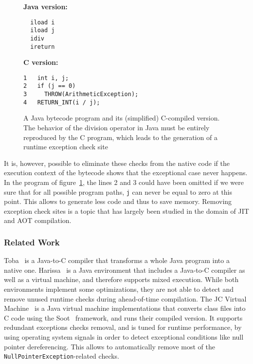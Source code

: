 \begin{figure}[t]
\begin{center}
\begin{minipage}[b]{0.4\linewidth}
\textbf{Java version:}
\centering
\begin{verbatim}
  iload i
  iload j
  idiv
  ireturn
\end{verbatim}
\end{minipage}
\hspace{0.5cm}
\begin{minipage}[b]{0.5\linewidth}
\textbf{C version:}
\centering
\begin{verbatim}
1   int i, j;
2   if (j == 0) 
3     THROW(ArithmeticException);
4   RETURN_INT(i / j);
\end{verbatim}
\end{minipage}
\end{center}
\caption{A Java bytecode program and its (simplified) C-compiled version. The behavior of the division operator in Java must be entirely reproduced by the C program, which leads to the generation of a runtime exception check site}
\label{fig:javatoc}
\end{figure}

It is, however, possible to eliminate these checks from the native code if the execution context of the bytecode shows that the exceptional case never happens. In the program of figure~\ref{fig:javatoc}, the lines 2 and 3 could have been omitted if we were sure that for all possible program paths, \texttt{j} can never be equal to zero at this point. This allows to generate less code and thus to save memory. Removing exception check sites is a topic that has largely been studied in the domain of JIT and AOT compilation.

\subsubsection{Related Work}
\label{sec:relatedwork}
Toba~\cite{Proebsting1997} is a Java-to-C compiler that transforms a whole Java program into a native one. Harissa~\cite{Muller1997} is a Java environment that includes a Java-to-C compiler as well as a virtual machine, and therefore supports mixed execution. While both environments implement some optimizations, they are not able to detect and remove unused runtime checks during ahead-of-time compilation. The JC Virtual Machine~\cite{JCVM} is a Java virtual machine implementations that converts class files into C code using the Soot~\cite{Raja1999} framework, and runs their compiled version. It supports redundant exceptions checks removal, and is tuned for runtime performance, by using operating system signals in order to detect exceptional conditions like null pointer dereferencing. This allows to automatically remove most of the \texttt{NullPointerException}-related checks.

